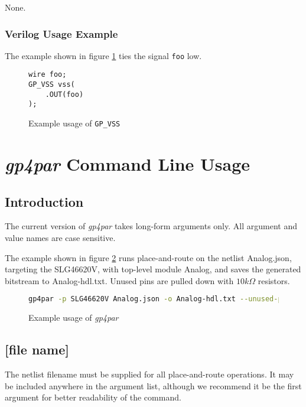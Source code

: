 \documentclass[11pt]{article}
\newcommand{\namestyle}[1]{\textit{#1}}
\newcommand{\tokenstyle}[1]{\texttt{#1}}
\newcommand{\wirestyle}[1]{\texttt{#1}}
\begin{document}
None.

\subsubsection{Verilog Usage Example}

The example shown in figure \ref{gp-vss-example} ties the signal \wirestyle{foo} low.

\begin{figure}[h]
\begin{lstlisting}
wire foo;
GP_VSS vss(
	.OUT(foo)
);
\end{lstlisting}
\caption{Example usage of \tokenstyle{GP\_VSS}}
\label{gp-vss-example}
\end{figure}


\pagebreak
\section{\namestyle{gp4par} Command Line Usage}

\subsection{Introduction}

The current version of \namestyle{gp4par} takes long-form arguments only. All argument and value names are case sensitive.

The example shown in figure \ref{gp-cmd-example} runs place-and-route on the netlist Analog.json, targeting the
SLG46620V, with top-level module Analog, and saves the generated bitstream to Analog-hdl.txt. Unused pins are pulled
down with $10 k\Omega$ resistors.

\begin{figure}[h]
\begin{lstlisting}[language=sh]
gp4par -p SLG46620V Analog.json -o Analog-hdl.txt --unused-pull down --unused-drive 10k
\end{lstlisting}
\caption{Example usage of \namestyle{gp4par}}
\label{gp-cmd-example}
\end{figure}

\subsection{[file name]}

The netlist filename must be supplied for all place-and-route operations. It may be included anywhere in the argument
list, although we recommend it be the first argument for better readability of the command.
\end{document}
